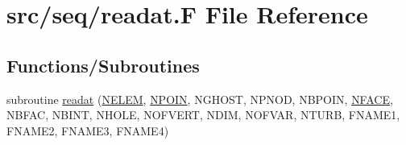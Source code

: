 \hypertarget{seq_2readat_8_f}{\section{src/seq/readat.F File Reference}
\label{seq_2readat_8_f}
}
\subsection*{Functions/\-Subroutines}
\begin{DoxyCompactItemize}
\item 
subroutine \hyperlink{seq_2readat_8_f_aa00d344ba9f5d129f63e7747fe2397d4}{readat} (\hyperlink{mesh_8com_aee5e75b79d0e815c0603cfbccc618957}{N\-E\-L\-E\-M}, \hyperlink{mesh_8com_ae28c1572321efcd8715b974d87d20c58}{N\-P\-O\-I\-N}, N\-G\-H\-O\-S\-T, N\-P\-N\-O\-D, N\-B\-P\-O\-I\-N, \hyperlink{mesh_8com_a78142d59d4cbb9fedbede16187658dd3}{N\-F\-A\-C\-E}, N\-B\-F\-A\-C, N\-B\-I\-N\-T, N\-H\-O\-L\-E, N\-O\-F\-V\-E\-R\-T, N\-D\-I\-M, N\-O\-F\-V\-A\-R, N\-T\-U\-R\-B, F\-N\-A\-M\-E1, F\-N\-A\-M\-E2, F\-N\-A\-M\-E3, F\-N\-A\-M\-E4)
\end{DoxyCompactItemize}


